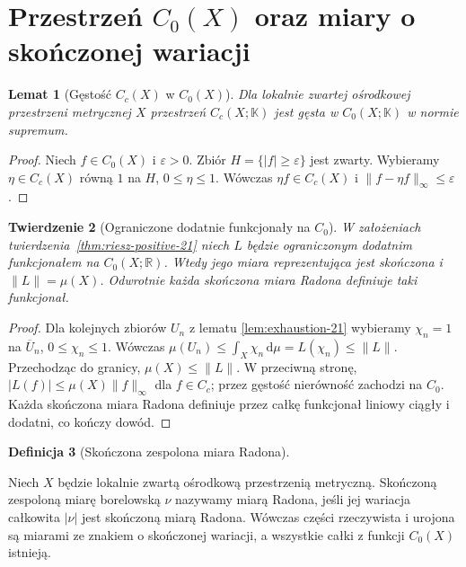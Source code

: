 \documentclass[11pt,a4paper,oneside]{book}
\numberwithin{equation}{chapter}
\theoremstyle{plain}
\newtheorem{twierdzenie}{Twierdzenie}[chapter]
\newtheorem{lemat}[twierdzenie]{Lemat}
\theoremstyle{definition}
\newtheorem{definicja}[twierdzenie]{Definicja}
\theoremstyle{remark}
\begin{document}
\section{Przestrzeń $C_0(X)$ oraz miary o skończonej wariacji}
\begin{lemat}[Gęstość $C_c(X)$ w $C_0(X)$]
\label{lem:density-cc-c0-21}
Dla lokalnie zwartej ośrodkowej przestrzeni metrycznej
$X$ przestrzeń $C_c(X;\mathbb K)$ jest gęsta w
$C_0(X;\mathbb K)$ w normie supremum.
\end{lemat}
\begin{proof}
Niech $f\in C_0(X)$ i $\varepsilon>0$.
Zbiór $H=\{|f|\ge\varepsilon\}$ jest zwarty.
Wybieramy $\eta\in C_c(X)$ równą $1$ na $H$,
$0\le\eta\le1$. Wówczas $\eta f\in C_c(X)$
i $\|f-\eta f\|_\infty\le\varepsilon$.
\end{proof}

\begin{twierdzenie}[Ograniczone dodatnie funkcjonały na $C_0$]
\label{thm:riesz-c0-positive-21}
W założeniach twierdzenia~\ref{thm:riesz-positive-21}
niech $L$ będzie ograniczonym dodatnim funkcjonałem
na $C_0(X;\mathbb R)$. Wtedy jego miara reprezentująca
jest skończona i $\|L\|=\mu(X)$. Odwrotnie każda
skończona miara Radona definiuje taki funkcjonał.
\end{twierdzenie}
\begin{proof}
Dla kolejnych zbiorów $U_n$ z lematu
\ref{lem:exhaustion-21} wybieramy $\chi_n=1$
na $\overline U_n$, $0\le\chi_n\le1$.
Wówczas $\mu(U_n)\le\int_X\chi_n\,\mathrm d\mu
=L(\chi_n)\le\|L\|$. Przechodząc do granicy,
$\mu(X)\le\|L\|$. W przeciwną stronę,
$|L(f)|\le\mu(X)\|f\|_\infty$ dla $f\in C_c$;
przez gęstość nierówność zachodzi na $C_0$.
Każda skończona miara Radona definiuje przez całkę
funkcjonał liniowy ciągły i dodatni, co kończy dowód.
\end{proof}

\begin{definicja}[Skończona zespolona miara Radona]\label{idx:21:definicja:08}

Niech $X$ będzie lokalnie zwartą ośrodkową przestrzenią
metryczną. Skończoną zespoloną miarę borelowską $\nu$
nazywamy miarą Radona, jeśli jej wariacja całkowita
$|\nu|$ jest skończoną miarą Radona. Wówczas części
rzeczywista i urojona są miarami ze znakiem o skończonej
wariacji, a wszystkie całki z funkcji $C_0(X)$ istnieją.
\end{definicja}
\end{document}
